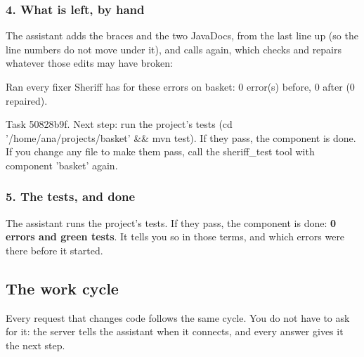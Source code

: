 \documentclass[11pt,a4paper]{article}
\begin{document}
\subsubsection{4. What is left, by hand}
The assistant adds the braces and the two JavaDocs, from the last line up (so
the line numbers do not move under it), and calls  again,
which checks and repairs whatever those edits may have broken:

\begin{answer}
Ran every fixer Sheriff has for these errors on basket: 0 error(s) before, 0 after (0 repaired).

Task 50828b9f.
Next step: run the project's tests (cd '/home/ana/projects/basket' && mvn test). If they pass, the component is done. If you change any file to make them pass, call the sheriff_test tool with component 'basket' again.
\end{answer}

\subsubsection{5. The tests, and done}
The assistant runs the project's tests. If they pass, the component is done:
\textbf{0 errors and green tests}. It tells you so in those terms, and which
errors were there before it started.

\subsection{The work cycle}

Every request that changes code follows the same cycle. You do not have to ask
for it: the server tells the assistant when it connects, and every answer gives
it the next step.
\end{document}

